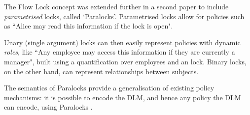 The Flow Lock concept was extended further in a second paper \cite{broberg2010paralocks} to include \textit{parametrised} locks, called `Paralocks'. Parametrised locks allow for policies such as ``Alice may read this information if the lock  is open".

Unary (single argument) locks can then easily represent policies with dynamic \textit{roles}, like ``Any employee may access this information if they are currently a manager", built using a quantification over employees and an  lock. Binary locks, on the other hand, can represent relationships between subjects.

The semantics of Paralocks provide a generalisation of existing policy mechanisms: it is possible to encode the DLM, and hence any policy the DLM can encode, using Paralocks \cite{broberg2010paralocks}.
%
%
%
%
%
%
%
%

%
%
%
%
%





